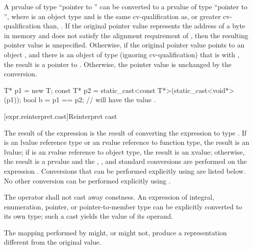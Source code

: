 \pnum
A prvalue of type ``pointer to  '' can be
converted to a prvalue of type ``pointer to  '',
where  is an object type and  is the same
cv-qualification as, or greater cv-qualification than, .
If the original pointer value represents the address
 of a byte in memory and
 does not satisfy the alignment requirement of ,
then the resulting pointer value is unspecified.
Otherwise, if the original pointer value points to an object ,
and there is an object  of type  (ignoring cv-qualification)
that is  with ,
the result is a pointer to .
Otherwise, the pointer value is unchanged by the conversion.
\begin{example}
\begin{codeblock}
T* p1 = new T;
const T* p2 = static_cast<const T*>(static_cast<void*>(p1));
bool b = p1 == p2;  //  will have the value .
\end{codeblock}
\end{example}

[expr.reinterpret.cast]{Reinterpret cast}

\pnum
{}%
%
The result of the expression  is the
result of converting the expression  to type .
%
%
If  is an lvalue reference type or an rvalue reference to function type, the result is an lvalue;
if  is an rvalue reference to object type, the result is an xvalue;
otherwise, the result is a prvalue and the
, ,
and  standard conversions are
performed on the expression . Conversions that can be performed explicitly
using  are listed below. No other conversion can
be performed explicitly using .

\pnum
The  operator shall not cast away constness.
An expression of integral, enumeration, pointer, or pointer-to-member type
can be explicitly converted to its own type; such a cast yields the value of
its operand.

\pnum
\begin{note}
The mapping performed by  might, or might not, produce a
representation different from the original value.
\end{note}

